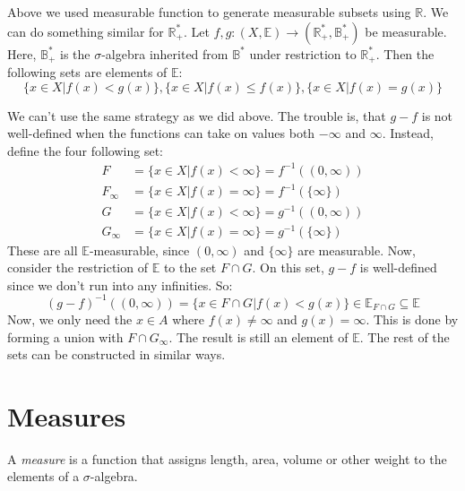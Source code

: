 \documentclass[12pt, a4paper]{article}
\numberwithin{equation}{section}
\begin{document}
Above we used measurable function to generate measurable subsets using $\mathbb{R}$. We can do something similar for $\mathbb{R}^*_+$. Let $f, g: (X,\mathbb{E})\rightarrow(\mathbb{R}^*_+,\mathbb{B}^*_+)$ be measurable. Here, $\mathbb{B}^*_+$ is the $\sigma$-algebra inherited from $\mathbb{B}^*$ under restriction to $\mathbb{R}^*_+$. Then the following sets are elements of $\mathbb{E}$:
\begin{equation}
\label{R*+_measurable}
\{x\in X|f(x)<g(x)\}, \{x\in X|f(x)\le f(x)\}, \{x\in X|f(x)=g(x)\}
\end{equation}

We can't use the same strategy as we did above. The trouble is, that $g-f$ is not well-defined when the functions can take on values both $-\infty$ and $\infty$. Instead, define the four following set:
\begin{align}
F&=\{x\in X|f(x)<\infty\}=f^{-1}((0,\infty))\\
F_\infty&=\{x\in X|f(x)=\infty\}=f^{-1}(\{\infty\}) \\
G&=\{x\in X|f(x)<\infty\}=g^{-1}((0,\infty))\\
G_\infty&=\{x\in X|f(x)=\infty\}=g^{-1}(\{\infty\})
\end{align}
These are all $\mathbb{E}$-measurable, since $(0,\infty)$ and $\{\infty\}$ are measurable. Now, consider the restriction of $\mathbb{E}$ to the set $F\cap G$. On this set, $g-f$ is well-defined since we don't run into any infinities. So:
\begin{equation}
(g-f)^{-1}((0,\infty))=\{x\in F\cap G|f(x)<g(x)\}\in\mathbb{E}_{F\cap G}\subseteq\mathbb{E}
\end{equation}
Now, we only need the $x\in A$ where $f(x)\neq\infty$ and $g(x)=\infty$. This is done by forming a union with $F\cap G_\infty$. The result is still an element of $\mathbb{E}$. The rest of the sets can be constructed in similar ways.

\section{Measures}
A \textit{measure} is a function that assigns length, area, volume or other weight to the elements of a $\sigma$-algebra.
\end{document}
